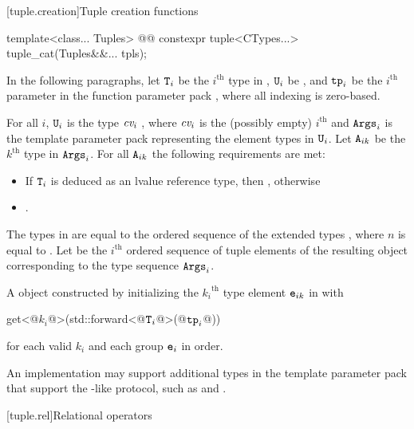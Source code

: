 \documentclass{wg21}
\begin{document}
[tuple.creation]{Tuple creation functions}


\begin{itemdecl}
template<class... Tuples>
@@
constexpr tuple<CTypes...> tuple_cat(Tuples&&... tpls);
\end{itemdecl}

\begin{itemdescr}
\pnum
In the following paragraphs, let $\texttt{T}_i$ be the $i^\text{th}$ type in ,
$\texttt{U}_i$ be , and $\texttt{tp}_i$ be the $i^\text{th}$
parameter in the function parameter pack , where all indexing is
zero-based.

\pnum
\expects
For all $i$, $\texttt{U}_i$ is the type
$\textit{cv}_i$ , where $\textit{cv}_i$ is the (possibly empty) $i^\text{th}$
 and $\texttt{Args}_i$ is the template parameter pack representing the element
types in $\texttt{U}_i$. Let $\texttt{A}_{ik}$ be the ${k}^\text{th}$ type in $\texttt{Args}_i$. For all
$\texttt{A}_{ik}$ the following requirements are met:
\begin{itemize}
    \item If $\texttt{T}_i$ is deduced as an lvalue reference type, then
    , otherwise
    \item {}.
\end{itemize}

\pnum
\remarks
The types in  are equal to the ordered
sequence of the extended types
,
where $n$ is
equal to . Let  be the $i^\text{th}$
ordered sequence of tuple elements of the resulting  object
corresponding to the type sequence $\texttt{Args}_i$.

\pnum
\returns
A  object constructed by initializing the ${k_i}^\text{th}$
type element $\texttt{e}_{ik}$ in  with
\begin{codeblock}
    get<@$k_i$@>(std::forward<@$\texttt{T}_i$@>(@$\texttt{tp}_i$@))
\end{codeblock}
for each valid $k_i$ and each group $\texttt{e}_i$ in order.

\pnum
\begin{removedblock}
\begin{note}
    An implementation may support additional types in the template parameter
    pack  that support the -like protocol, such as
     and .
\end{note}
\end{removedblock}

\end{itemdescr}
[tuple.rel]{Relational operators}
\end{document}
